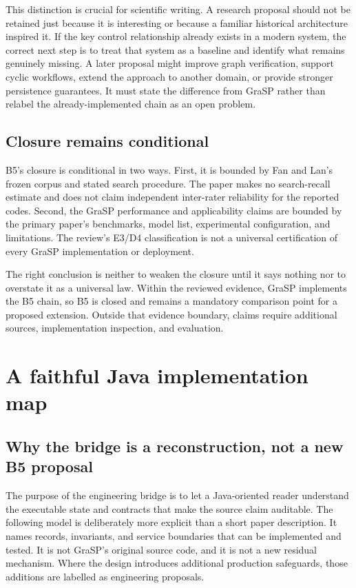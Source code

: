 This distinction is crucial for scientific writing. A research proposal should not be retained just because it is interesting or because a familiar historical architecture inspired it. If the key control relationship already exists in a modern system, the correct next step is to treat that system as a baseline and identify what remains genuinely missing. A later proposal might improve graph verification, support cyclic workflows, extend the approach to another domain, or provide stronger persistence guarantees. It must state the difference from GraSP rather than relabel the already-implemented chain as an open problem.

\subsection{Closure remains conditional}

B5's closure is conditional in two ways. First, it is bounded by Fan and Lan's frozen corpus and stated search procedure. The paper makes no search-recall estimate and does not claim independent inter-rater reliability for the reported codes. Second, the GraSP performance and applicability claims are bounded by the primary paper's benchmarks, model list, experimental configuration, and limitations. The review's E3/D4 classification is not a universal certification of every GraSP implementation or deployment.

The right conclusion is neither to weaken the closure until it says nothing nor to overstate it as a universal law. Within the reviewed evidence, GraSP implements the B5 chain, so B5 is closed and remains a mandatory comparison point for a proposed extension. Outside that evidence boundary, claims require additional sources, implementation inspection, and evaluation.

\section{A faithful Java implementation map}
\label{sec:ch17-implementation-map}

\subsection{Why the bridge is a reconstruction, not a new B5 proposal}

The purpose of the engineering bridge is to let a Java-oriented reader understand the executable state and contracts that make the source claim auditable. The following model is deliberately more explicit than a short paper description. It names records, invariants, and service boundaries that can be implemented and tested. It is not GraSP's original source code, and it is not a new residual mechanism. Where the design introduces additional production safeguards, those additions are labelled as engineering proposals.

